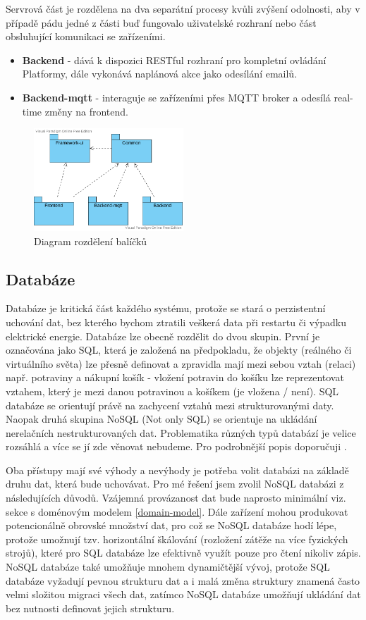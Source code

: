 Servrová část je rozdělena na dva separátní procesy kvůli zvýšení odolnosti, aby v případě pádu jedné z části buď fungovalo uživatelské rozhraní nebo část obsluhující komunikaci se zařízeními.
\begin{itemize}
    \item \textbf{Backend} - dává k dispozici RESTful rozhraní pro kompletní ovládání Platformy, dále vykonává naplánová akce jako odesílání emailů.
    \item \textbf{Backend-mqtt} - interaguje se zařízeními přes MQTT broker a odesílá real-time změny na frontend.
\end{itemize}

\begin{figure}[htbp]
    \label{packages-uml}
    \centering
    \includegraphics[width=0.5\textwidth]{img/packages.pdf}
    \caption{Diagram rozdělení balíčků}
\end{figure}

\subsection{Databáze}
Databáze je kritická část každého systému, protože se stará o perzistentní uchování dat, bez kterého bychom ztratili veškerá data při restartu či výpadku elektrické energie. Databáze lze obecně rozdělit do dvou skupin. První je označována jako SQL, která je založená na předpokladu, že objekty (reálného či virtuálního světa) lze přesně definovat a zpravidla mají mezi sebou vztah (relaci) např. potraviny a nákupní košík - vložení potravin do košíku lze reprezentovat vztahem, který je mezi danou potravinou a košíkem (je vložena / není). SQL databáze se orientují právě na zachycení vztahů mezi strukturovanými daty. Naopak druhá skupina NoSQL (Not only SQL) se orientuje na ukládání nerelačních nestrukturovaných dat. Problematika různých typů databází je velice rozsáhlá a více se jí zde věnovat nebudeme. Pro podrobnější popis doporučuji \cite{sql-and-nosql}.

Oba přístupy mají své výhody a nevýhody je potřeba volit databázi na základě druhu dat, která bude uchovávat. Pro mé řešení jsem zvolil NoSQL databázi z následujících důvodů. Vzájemná provázanost dat bude naprosto minimální viz. sekce s doménovým modelem \ref{domain-model}. Dále zařízení mohou produkovat potencionálně obrovské množství dat, pro což se NoSQL databáze hodí lépe, protože umožnují tzv. horizontální škálování (rozložení zátěže na více fyzických strojů), které pro SQL databáze lze efektivně využít pouze pro čtení nikoliv zápis. NoSQL databáze také umožňuje mnohem dynamičtější vývoj, protože SQL databáze vyžadují pevnou strukturu dat a i malá změna struktury znamená často velmi složitou migraci všech dat, zatímco NoSQL databáze umožňují ukládání dat bez nutnosti definovat jejich strukturu.

